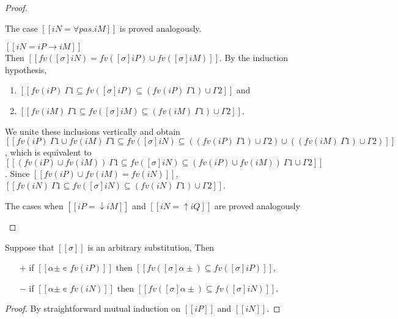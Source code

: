 \begin{proof}
\begin{caseof}
    \item The case $[[iN = ∀pas.iM]]$ is proved analogously.
    \item $[[iN = iP → iM]]$\\
      Then $[[fv([σ]iN) = fv([σ]iP) ∪ fv([σ]iM)]]$.
      By the induction hypothesis, 
      \begin{enumerate}
        \item $[[ fv(iP) \ Γ1 ⊆ fv([σ]iP) ⊆ (fv(iP) \ Γ1) ∪ Γ2]]$ and
        \item $[[ fv(iM) \ Γ1 ⊆ fv([σ]iM) ⊆ (fv(iM) \ Γ1) ∪ Γ2]]$.
      \end{enumerate}
      We unite these inclusions vertically and obtain
      $[[ fv(iP) \ Γ1 ∪ fv(iM) \ Γ1 ⊆ fv([σ]iN) ⊆ ((fv(iP) \ Γ1) ∪ Γ2) ∪ ((fv(iM) \ Γ1) ∪ Γ2)]]$,
      which is equivalent to 
      $[[ (fv(iP) ∪ fv(iM)) \ Γ1 ⊆ fv([σ]iN) ⊆ (fv(iP) ∪ fv(iM)) \ Γ1 ∪ Γ2]]$.
      Since $[[fv(iP) ∪ fv(iM) = fv(iN)]]$, 
      $[[fv(iN) \ Γ1 ⊆ fv([σ]iN) ⊆ (fv(iN) \ Γ1) ∪ Γ2]]$.
    \item The cases when $[[iP = ↓iM]]$ and $[[iN = ↑iQ]]$ are proved
      analogously
  \end{caseof}
\end{proof}

\begin{lemma}
  \label{lemma:subst-fv-image}
  Suppose that $[[σ]]$ is an arbitrary substitution, 
  Then 
  \begin{itemize}
    \item [$+$] if $[[α± ∊ fv(iP)]]$ then $[[ fv([σ]α±) ⊆ fv([σ]iP) ]]$,
    \item [$-$] if $[[α± ∊ fv(iN)]]$ then $[[ fv([σ]α±) ⊆ fv([σ]iN) ]]$.
  \end{itemize}
\end{lemma}
\begin{proof}
  By straightforward mutual induction on $[[iP]]$ and $[[iN]]$.
\end{proof}
